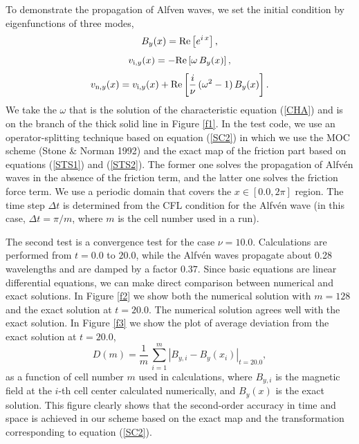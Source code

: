 \documentclass[12pt,preprint]{aastex}
\begin{document}
To demonstrate the propagation of Alfven waves, we set the initial condition by eigenfunctions of three modes,
\begin{equation}
B_{y}(x)={\rm Re}\left[ e^{i\,x} \right],
\end{equation}
\begin{equation}
v_{{\rm i},y}(x)=-{\rm Re}\left[\omega\,B_{y}(x)\right],
\end{equation}
\begin{equation}
v_{{\rm n},y}(x)=v_{{\rm i},y}(x)+{\rm Re}\left[\frac{i}{\nu}\,(\omega^{2}-1 )\,B_{y}(x)\right].
\end{equation}
We take the $\omega$ that is the solution of the characteristic equation (\ref{CHA}) and is on the branch of the thick solid line in Figure \ref{f1}.
In the test code, we use an operator-splitting technique based on equation (\ref{SC2}) in which we use the MOC scheme (Stone \& Norman 1992) and the exact map of the friction part based on equations (\ref{STS1}) and (\ref{STS2}).
The former one solves the propagation of Alfv\'en waves in the absence of the friction term, and the latter one solves the friction force term.
We use a periodic domain that covers the $x\in [0.0,2\pi]$ region.
The time step $\Delta t$ is determined from the CFL condition for the Alfv\'en wave (in this case, $\Delta t=\pi/m$, where $m$ is the cell number used in a run).

The second test is a convergence test for the case $\nu=10.0$.
Calculations are performed from $t=0.0$ to $20.0$, while the Alfv\'en waves propagate about 0.28 wavelengths and are damped by a factor $0.37$.
Since basic equations are linear differential equations, we can make direct comparison between numerical and exact solutions.
In Figure \ref{f2} we show both the numerical solution with $m=128$ and the exact solution at $t=20.0$.
The numerical solution agrees well with the exact solution.
In Figure \ref{f3} we show the plot of average deviation from the exact solution at $t=20.0$,
\begin{equation}
D(m)=\frac{1}{m}\,\sum_{i=1}^{m}\left|B_{y,i}-B_{y}(x_{i})\right|_{t=20.0},
\end{equation}
as a function of cell number $m$ used in calculations, where $B_{y,i}$ is the magnetic field at the $i$-th cell center calculated numerically, and $B_{y}(x)$ is the exact solution.
This figure clearly shows that the second-order accuracy in time and space is achieved in our scheme based on the exact map and the transformation corresponding to equation (\ref{SC2}).
\end{document}
